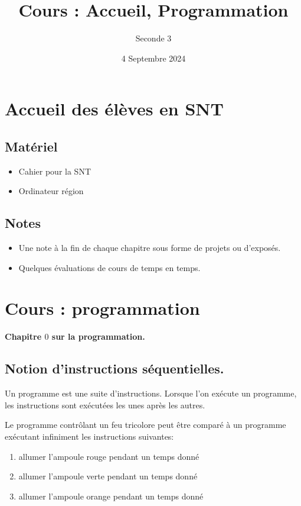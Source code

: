 \documentclass{article}
\title{Cours : Accueil, Programmation}
\date{4 Septembre 2024}
\author{Seconde 3}
\begin{document}
\maketitle

\section{Accueil des élèves en SNT}
\subsection{Matériel}
\begin{itemize}
\item Cahier pour la SNT
\item Ordinateur région
\end{itemize}
\subsection{Notes}
\begin{itemize}
\item Une note à la fin de chaque chapitre sous forme de projets ou d'exposés.
\item Quelques évaluations de cours de temps en temps.
\end{itemize}

\section{Cours : programmation}

\textbf{Chapitre $0$ sur la programmation.}

\subsection{Notion d'instructions séquentielles.}

\begin{definition}
Un programme est une suite d'instructions. Lorsque l'on exécute un programme, les instructions sont exécutées les unes après les autres.
\end{definition}
\begin{example}
Le programme contrôlant un feu tricolore peut être comparé à un programme exécutant infiniment les instructions suivantes: 
\begin{enumerate}
\item allumer l'ampoule rouge pendant un temps donné
\item allumer l'ampoule verte pendant un temps donné
\item allumer l'ampoule orange pendant un temps donné
\end{enumerate}
\end{example}
\end{document}
